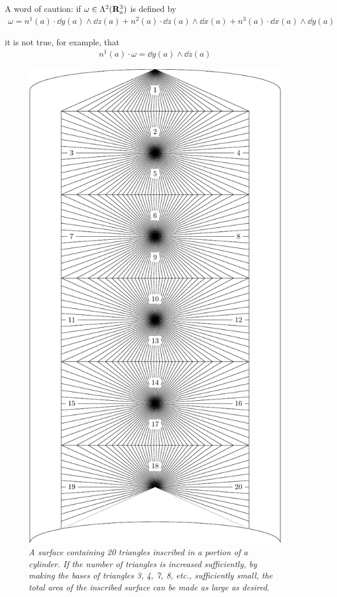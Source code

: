 A word of caution: if $\omega\in \Lambda^2(\mathbf{R}^3_a)$ is defined by 
\begin{align*}
    \omega
    = n^1(a)\cdot \dd y(a)\wedge\dd z(a)
    + n^{2}(a)\cdot\dd z(a)\wedge\dd x(a)
    + n^{3}(a)\cdot\dd x(a)\wedge\dd y(a)
\end{align*}

it is not true, for example, that
\begin{align*}
    n^1(a)\cdot\omega = \dd y(a)\wedge\dd z(a)
\end{align*}

\begin{figure}[!htb]
    \centering
    \includegraphics[width=.75\linewidth]{./pics/Fig5-9.pdf}
    \caption{\textit{A surface containing 20 triangles inscribed in a portion of a cylinder. 
    If the number of triangles is increased sufficiently, by making the bases of triangles 
    3, 4, 7, 8, etc., sufficiently small, the total area of the inscribed surface can be made as 
    large as desired.}}
    \label{Fig 5-9}
\end{figure}

